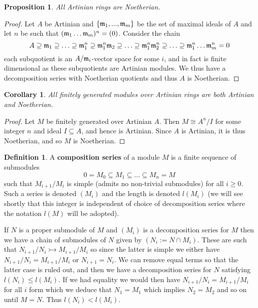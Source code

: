 \documentclass[12pt]{article}
\theoremstyle{plain}
\newtheorem{proposition}[thm]{Proposition}
\newtheorem{cor}[thm]{Corollary}
\theoremstyle{definition}
\newtheorem{defn}[thm]{Definition} %
\begin{document}
\begin{proposition}
All Artinian rings are Noetherian.
\end{proposition}
\begin{proof}
Let $A$ be Artinian and $\lbrace \frak{m}_1,...,\frak{m}_m\rbrace$ be the set of maximal ideals of $A$ and let $n$ be such that $(\frak{m}_1\hdots\frak{m}_m)^n = (0)$. Consider the chain
\[A \supseteq \frak{m}_1 \supseteq \hdots \supseteq \frak{m}_1^n \supseteq \frak{m}_1^n\frak{m}_2\supseteq\hdots\supseteq \frak{m}_1^n\frak{m}_2^n \supseteq \hdots \supseteq \frak{m}_1^n\hdots\frak{m}_m^n = 0\]
each subquotient is an $A/\frak{m}_i$-vector space for some $i$, and in fact is finite dimensional as these subquotients are Artinian modules.  We thus have a decomposition series with Noetherian quotients and thus $A$ is Noetherian.
\end{proof}
\begin{cor}
All finitely generated modules over Artinian rings are both Artinian and Noetherian.
\end{cor}
\begin{proof}
Let $M$ be finitely generated over Artinian $A$. Then $M \cong A^n/I$ for some integer $n$ and ideal $I \subseteq A$, and hence is Artinian. Since $A$ is Artinian, it is thus Noetherian, and so $M$ is Noetherian.
\end{proof}
\begin{defn}
A \textbf{composition series} of a module $M$ is a finite sequence of submodules
\[0 = M_0 \subseteq M_1 \subseteq \hdots \subseteq M_n = M\]
such that $M_{i+1}/M_{i}$ is simple (admits no non-trivial submodules) for all $i \geq 0$. Such a series is denoted $(M_i)$ and the length is denoted $l(M_i)$ (we will see shortly that this integer is independent of choice of decomposition series where the notation $l(M)$ will be adopted).
\end{defn}
If $N$ is a proper submodule of $M$ and $(M_i)$ is a decomposition series for $M$ then we have a chain of submodules of $N$ given by $(N_i := N \cap M_i)$. These are such that $N_{i+1}/N_{i} \rightarrowtail M_{i+1}/M_i$ so since the latter is simple we either have $N_{i+1}/N_i = M_{i+1}/M_i$ or $N_{i+1} = N_i$. We can remove equal terms so that the latter case is ruled out, and then we have a decomposition series for $N$ satisfying $l(N_i) \leq l(M_i)$. If we had equality we would then have $N_{i+1}/N_i = M_{i+1}/M_i$ for all $i$ form which we deduce that $N_1 = M_{1}$ which implies $N_2 = M_2$ and so on until $M = N$. Thus $l(N_i) < l(M_i)$.
\end{document}
